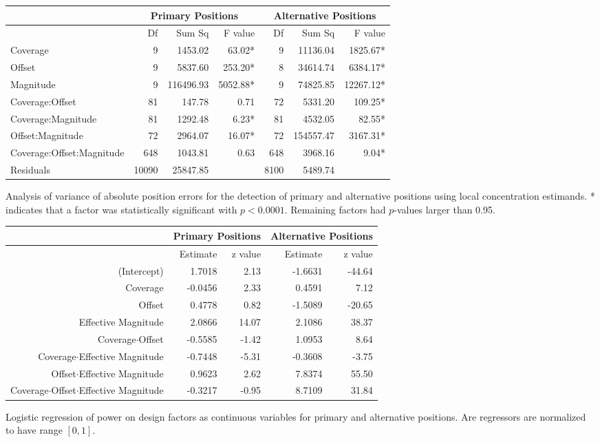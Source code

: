 \begin{FPtable}
\begin{sideways}
\begin{tabular}{l|rrr|rrr}
\hline 
 & \multicolumn{3}{c|}{Primary Positions} & \multicolumn{3}{c}{Alternative Positions}\tabularnewline
\hline 
 & Df  & Sum Sq  & F value  & Df  & Sum Sq  & F value \tabularnewline
\hline 
Coverage & 9  & 1453.02  & 63.02{*} & 9  & 11136.04  & 1825.67{*} \tabularnewline
Offset  & 9  & 5837.60  & 253.20{*}  & 8  & 34614.74  & 6384.17{*} \tabularnewline
Magnitude  & 9  & 116496.93  & 5052.88{*}  & 9  & 74825.85  & 12267.12{*} \tabularnewline
Coverage:Offset  & 81  & 147.78  & 0.71\phantom{*}  & 72  & 5331.20  & 109.25{*} \tabularnewline
Coverage:Magnitude  & 81  & 1292.48  & 6.23{*}  & 81  & 4532.05  & 82.55{*} \tabularnewline
Offset:Magnitude  & 72  & 2964.07  & 16.07{*} & 72  & 154557.47  & 3167.31{*} \tabularnewline
Coverage:Offset:Magnitude  & 648  & 1043.81  & 0.63\phantom{*}  & 648  & 3968.16  & 9.04{*} \tabularnewline
Residuals  & 10090  & 25847.85  &  & 8100  & 5489.74  & \tabularnewline
\hline 
\end{tabular}
\end{sideways}
\caption{Analysis of variance of absolute position errors for the detection
of primary and alternative positions using local concentration estimands.
{*} indicates that a factor was statistically significant with $p<0.0001$.
Remaining factors had $p$-values larger than 0.95.
\label{nucleosomes:tab:detectionAnova}
\vspace{72pt}}
\end{FPtable}
\afterpage{\clearpage}

\begin{FPtable}
\begin{sideways}
\begin{tabular}{r|rr|rr}
\hline 
 & \multicolumn{2}{c|}{Primary Positions} & \multicolumn{2}{c}{Alternative Positions}\tabularnewline
\hline 
 & Estimate  & z value  & Estimate  & z value \tabularnewline
\hline 
(Intercept)  & 1.7018  & 2.13  & -1.6631  & -44.64 \tabularnewline
Coverage & -0.0456  & 2.33  & 0.4591  & 7.12 \tabularnewline
Offset  & 0.4778  & 0.82  & -1.5089  & -20.65 \tabularnewline
Effective Magnitude  & 2.0866  & 14.07  & 2.1086  & 38.37 \tabularnewline
Coverage$\cdot$Offset  & -0.5585  & -1.42  & 1.0953  & 8.64 \tabularnewline
Coverage$\cdot$Effective Magnitude  & -0.7448  & -5.31  & -0.3608  & -3.75 \tabularnewline
Offset$\cdot$Effective Magnitude  & 0.9623  & 2.62  & 7.8374  & 55.50 \tabularnewline
Coverage$\cdot$Offset$\cdot$Effective Magnitude  & -0.3217  & -0.95  & 8.7109  & 31.84 \tabularnewline
\hline 
\end{tabular}
\end{sideways}
\caption{Logistic regression of power on design factors as continuous variables
for primary and alternative positions. Are regressors are normalized
to have range $[0,1]$.
\label{nucleosomes:tab:detectionGlm}
\vspace{72pt}}
\end{FPtable}
\afterpage{\clearpage}
\fi

